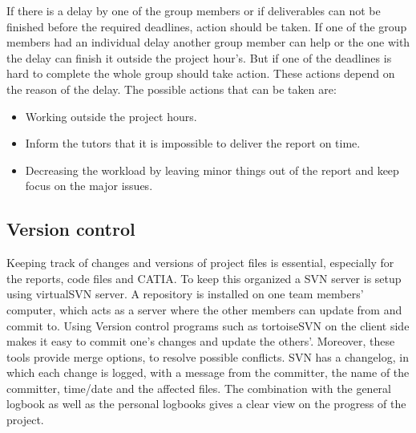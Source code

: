 \documentclass[a4paper]{report}
\begin{document}
If there is a delay by one of the group members or if deliverables can not be finished before the required deadlines, action should be taken. If one of the group members had an individual delay another group member can help or the one with the delay can finish it outside the project hour's. But if one of the deadlines is hard to complete the whole group should take action. These actions depend on the reason of the delay. The possible actions that can be taken are:
\begin{itemize}
\item Working outside the project hours.
\item Inform the tutors that it is impossible to deliver the report on time.
\item Decreasing the workload by leaving minor things out of the report and keep focus on the major issues.
\end{itemize}

\subsection{Version control}
Keeping track of changes and versions of project files is essential, especially for the reports, code files and CATIA. To keep this organized a SVN server is setup using virtualSVN server. A repository is installed on one team members' computer,  which acts as a server where the other members can update from and commit to. Using Version control programs such as tortoiseSVN on the client side makes it easy to commit one's changes and update the others'. Moreover, these tools provide merge options, to resolve possible conflicts. SVN has a changelog, in which each change is logged, with a message from the committer, the name of the committer, time/date and the affected files. The combination with the general logbook as well as the personal logbooks gives a clear view on the progress of the project. 
\end{document}
